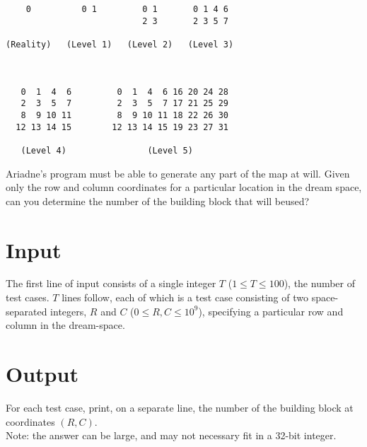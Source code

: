 \begin{center}
\begin{minipage}{8cm}
\begin{verbatim}
    0          0 1         0 1       0 1 4 6
                           2 3       2 3 5 7

(Reality)   (Level 1)   (Level 2)   (Level 3)



   0  1  4  6         0  1  4  6 16 20 24 28
   2  3  5  7         2  3  5  7 17 21 25 29
   8  9 10 11         8  9 10 11 18 22 26 30
  12 13 14 15        12 13 14 15 19 23 27 31

   (Level 4)                (Level 5)

\end{verbatim}
\end{minipage}
\end{center}

Ariadne's program must be able to generate any part of the map at will. Given only the row and column coordinates for a particular location in the dream space, can you determine the number of the building block that will beused?

\section*{Input}
The first line of input consists of a single integer $T$ ($1 \leq T \leq 100$), the number of test cases.
$T$ lines follow, each of which is a test case consisting of two space-separated integers, $R$ and $C$ ($0 \leq R, C \leq 10^{9}$), specifying a particular row and column in the dream-space.\\

\section*{Output}
For each test case, print, on a separate line, the number of the building block at coordinates $(R, C)$.\\
Note: the answer can be large, and may not necessary fit in a 32-bit integer.\\
